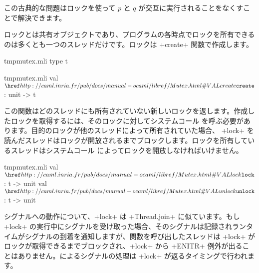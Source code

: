 この古典的な問題はロックを使って $p$ と $q$ が交互に実行されることをなくすことで解決できます。

ロックとは共有オブジェクトであり、プログラムの各時点でロックを所有できるのは多くとも一つのスレッドだけです。ロックは \ml+create+ 関数で作成します。
%
\begin{codefile}{tmpmutex.mli}
  type t
\end{codefile}
%
\begin{listingcodefile}{tmpmutex.mli}
val $\libvalue{Mutex}{create}$ : unit -> t
\end{listingcodefile}
%
この関数はどのスレッドにも所有されていない新しいロックを返します。作成したロックを取得するには、そのロックに対してシステムコール  を呼ぶ必要があります。目的のロックが他のスレッドによって所有されていた場合、 \ml+lock+ を読んだスレッドはロックが開放されるまでブロックします。ロックを所有しているスレッドはシステムコール  によってロックを開放しなければいけません。
%
\begin{listingcodefile}{tmpmutex.mli}
val $\libvalue{Mutex}{lock}$ : t -> unit
val $\libvalue{Mutex}{unlock}$ : t -> unit
\end{listingcodefile}
%
シグナルへの動作について、\ml+lock+ は \ml+Thread.join+ に似ています。もし \ml+lock+ の実行中にシグナルを受け取った場合、そのシグナルは記録され\ocaml ランタイムがシグナルの到着を通知しますが、関数を呼び出したスレッドは \ml+lock+ がロックが取得できるまでブロックされ、\ml+lock+ から \ml+ENITR+ 例外が出ることはありません。\ocaml によるシグナルの処理は \ml+lock+ が返るタイミングで行われます。

